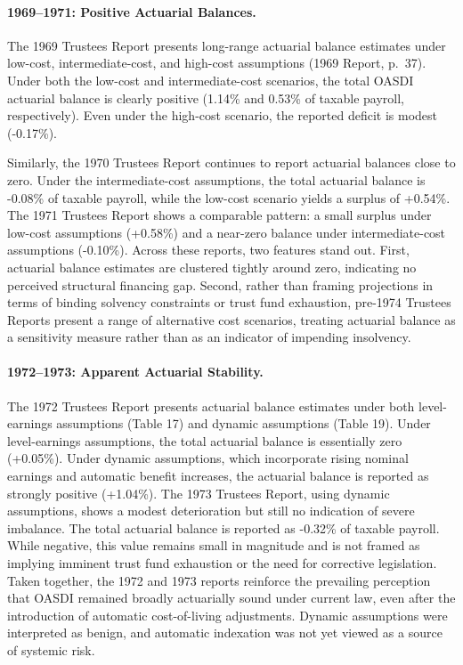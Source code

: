 \documentclass[12pt]{article}%
\theoremstyle{remark}
\begin{document}
\paragraph{1969–1971: Positive Actuarial Balances.}
The 1969 Trustees Report presents long-range actuarial balance estimates under low-cost, intermediate-cost, and high-cost assumptions (1969 Report, p.~37). Under both the low-cost and intermediate-cost scenarios, the total OASDI actuarial balance is clearly positive (1.14\% and 0.53\% of taxable payroll, respectively). Even under the high-cost scenario, the reported deficit is modest (-0.17\%).

Similarly, the 1970 Trustees Report continues to report actuarial balances close to zero. Under the intermediate-cost assumptions, the total actuarial balance is -0.08\% of taxable payroll, while the low-cost scenario yields a surplus of +0.54\%. The 1971 Trustees Report shows a comparable pattern: a small surplus under low-cost assumptions (+0.58\%) and a near-zero balance under intermediate-cost assumptions (-0.10\%).
Across these reports, two features stand out. First, actuarial balance estimates are clustered tightly around zero, indicating no perceived structural financing gap. Second, rather than framing projections in terms of binding solvency constraints or trust fund exhaustion, pre-1974 Trustees Reports present a range of alternative cost scenarios, treating actuarial balance as a sensitivity measure rather than as an indicator of impending insolvency.
\paragraph{1972–1973: Apparent Actuarial Stability.}
The 1972 Trustees Report presents actuarial balance estimates under both level-earnings assumptions (Table 17) and dynamic assumptions (Table 19). Under level-earnings assumptions, the total actuarial balance is essentially zero (+0.05\%). Under dynamic assumptions, which incorporate rising nominal earnings and automatic benefit increases, the actuarial balance is reported as strongly positive (+1.04\%).
The 1973 Trustees Report, using dynamic assumptions, shows a modest deterioration but still no indication of severe imbalance. The total actuarial balance is reported as -0.32\% of taxable payroll. While negative, this value remains small in magnitude and is not framed as implying imminent trust fund exhaustion or the need for corrective legislation.
Taken together, the 1972 and 1973 reports reinforce the prevailing perception that OASDI remained broadly actuarially sound under current law, even after the introduction of automatic cost-of-living adjustments. Dynamic assumptions were interpreted as benign, and automatic indexation was not yet viewed as a source of systemic risk.
\end{document}
